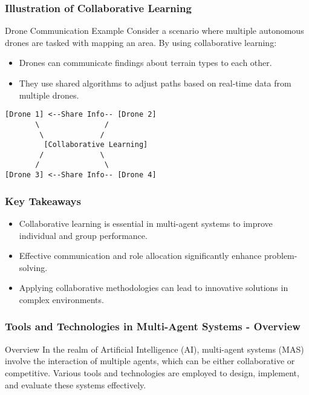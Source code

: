 \documentclass[aspectratio=169]{beamer}
\begin{document}
\begin{frame}[fragile]
    \frametitle{Illustration of Collaborative Learning}
    \begin{block}{Drone Communication Example}
    Consider a scenario where multiple autonomous drones are tasked with mapping an area. By using collaborative learning:
    \begin{itemize}
        \item Drones can communicate findings about terrain types to each other.
        \item They use shared algorithms to adjust paths based on real-time data from multiple drones.
    \end{itemize}
    \end{block}
    \begin{center}
    \begin{verbatim}
[Drone 1] <--Share Info-- [Drone 2]
       \               /
        \             /
         [Collaborative Learning]
        /             \
       /               \
[Drone 3] <--Share Info-- [Drone 4]
    \end{verbatim}
    \end{center}
\end{frame}

\begin{frame}[fragile]
    \frametitle{Key Takeaways}
    \begin{itemize}
        \item Collaborative learning is essential in multi-agent systems to improve individual and group performance.
        \item Effective communication and role allocation significantly enhance problem-solving.
        \item Applying collaborative methodologies can lead to innovative solutions in complex environments.
    \end{itemize}
\end{frame}

\begin{frame}[fragile]
    \frametitle{Tools and Technologies in Multi-Agent Systems - Overview}
    \begin{block}{Overview}
        In the realm of Artificial Intelligence (AI), multi-agent systems (MAS) involve the interaction of multiple agents, which can be either collaborative or competitive. Various tools and technologies are employed to design, implement, and evaluate these systems effectively. 
    \end{block}
\end{frame}
\end{document}
